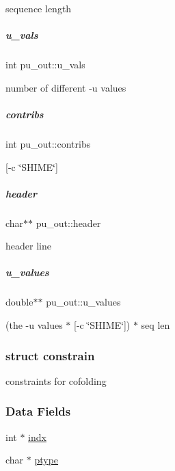 sequence length 

\mbox{\label{group__data__structures_a7697bc7a46cd1b8e37e337e708cb6023}} 
\subparagraph{\texorpdfstring{u\+\_\+vals}{u\_vals}}
{\footnotesize\ttfamily int pu\+\_\+out\+::u\+\_\+vals}



number of different -\/u values 

\mbox{\label{group__data__structures_a638b0de1837cfd441871d005d3ab2938}} 
\subparagraph{\texorpdfstring{contribs}{contribs}}
{\footnotesize\ttfamily int pu\+\_\+out\+::contribs}



\mbox{[}-\/c \char`\"{}\+S\+H\+I\+M\+E\char`\"{}\mbox{]} 

\mbox{\label{group__data__structures_ac9e9e30b16e7d04c770460b8487fb09d}} 
\subparagraph{\texorpdfstring{header}{header}}
{\footnotesize\ttfamily char$\ast$$\ast$ pu\+\_\+out\+::header}



header line 

\mbox{\label{group__data__structures_a366edbc4170d5c177908e178ff340828}} 
\subparagraph{\texorpdfstring{u\+\_\+values}{u\_values}}
{\footnotesize\ttfamily double$\ast$$\ast$ pu\+\_\+out\+::u\+\_\+values}



(the -\/u values $\ast$ \mbox{[}-\/c \char`\"{}\+S\+H\+I\+M\+E\char`\"{}\mbox{]}) $\ast$ seq len 

\label{structconstrain}
\subsubsection{struct constrain}
constraints for cofolding \subsubsection*{Data Fields}
\begin{DoxyCompactItemize}
\item 
int $\ast$ \mbox{\hyperlink{group__data__structures_a7b5c9ee296f446882c12fb49b4b70f8a}{indx}}
\item 
char $\ast$ \mbox{\hyperlink{group__data__structures_aa45a199810da246b6a23f93f49740595}{ptype}}
\end{DoxyCompactItemize}


